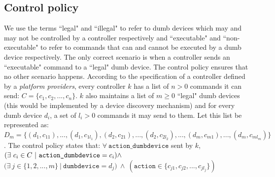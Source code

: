 \documentclass{article}
\begin{document}
\subsection{Control policy}
\label{subsec:control}
We use the terms ``legal" and ``illegal" to refer to dumb devices which may and may not be controlled by a controller respectively and ``executable" and ``non-executable" to refer to commands that can and cannot be executed by a dumb device respectively. The only correct scenario is when a controller sends an ``executable" command to a ``legal" dumb device. 
The control policy ensures that no other scenario happens. According to the specification of a controller defined by a \textit{platform providers}, every controller $k$ has a list of $n > 0$ commands it can send: $ C = \{c_1, c_2, ..., c_n\}$. $k$ also maintains a list of $m \geq 0$ ``legal" dumb devices (this would be implemented by a device discovery mechanism) and for every dumb device $d_i$,  a set of $l_i > 0$ commands it may send to them. Let this list be represented as: \\ $D_{m}= \{(d_{1}, c_{11}), ..., (d_{1}, c_{1l_1}), (d_{2}, c_{21}), ..., (d_{2}, c_{2l_2}), ..., (d_{m}, c_{m1}), ..., (d_m, c_{ml_m})\}$. The control policy states that: $\forall~\mathit{\texttt{action\_dumbdevice}}$ sent by $k$, 
$(\exists~ c_i \in C~|~\texttt{action\_dumbdevice} = c_i) \\ \wedge~$
$ (\exists~ j \in \{1, 2, ..., m\}~|~ \mathit{\texttt{dumbdevice} = d_j)}~\wedge~(\texttt{action} \in \{c_{j1}, c_{j2}, ..., c_{jl_j}\})$
\end{document}
